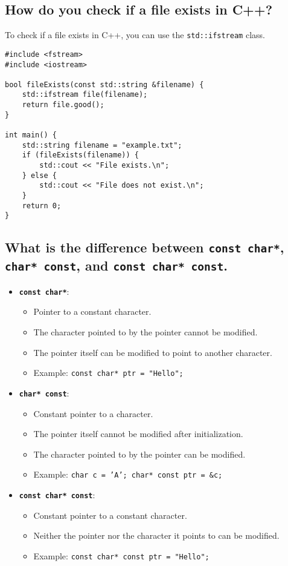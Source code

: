 \subsection{How do you check if a file exists in C++?}
To check if a file exists in C++, you can use the \texttt{std::ifstream} class.

\begin{tcolorbox}[title=File Exists]
\begin{verbatim}
#include <fstream>
#include <iostream>

bool fileExists(const std::string &filename) {
    std::ifstream file(filename);
    return file.good();
}

int main() {
    std::string filename = "example.txt";
    if (fileExists(filename)) {
        std::cout << "File exists.\n";
    } else {
        std::cout << "File does not exist.\n";
    }
    return 0;
}
\end{verbatim}
\end{tcolorbox}

\subsection{What is the difference between \texttt{const char*}, \texttt{char* const}, and \texttt{const char* const}.}
\begin{itemize}
    \item \textbf{\texttt{const char*}}:
    \begin{itemize}
        \item Pointer to a constant character.
        \item The character pointed to by the pointer cannot be modified.
        \item The pointer itself can be modified to point to another character.
        \item Example: \texttt{const char* ptr = "Hello";}
    \end{itemize}
    
    \item \textbf{\texttt{char* const}}:
    \begin{itemize}
        \item Constant pointer to a character.
        \item The pointer itself cannot be modified after initialization.
        \item The character pointed to by the pointer can be modified.
        \item Example: \texttt{char c = 'A'; char* const ptr = \&c;}
    \end{itemize}
    
    \item \textbf{\texttt{const char* const}}:
    \begin{itemize}
        \item Constant pointer to a constant character.
        \item Neither the pointer nor the character it points to can be modified.
        \item Example: \texttt{const char* const ptr = "Hello";}
    \end{itemize}
\end{itemize}

